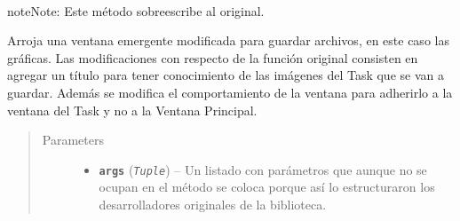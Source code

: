 \documentclass[class=report, crop=false]{standalone}
\begin{document}
\begin{fulllineitems}

\begin{fulllineitems}

~

\begin{notice}{note}{Note:}
Este método sobreescribe al original.
\end{notice}

Arroja una ventana emergente modificada para guardar archivos, 
en este caso las gráficas.\break
Las modificaciones con respecto de la función original consisten 
en agregar un título para tener conocimiento de las imágenes del 
Task que se van a guardar.\break
Además se modifica el comportamiento de la ventana para adherirlo 
a la ventana del Task y no a la Ventana Principal.

\begin{quote}\begin{description}
\item[{Parameters}] \leavevmode\begin{itemize}
\item \textbf{\texttt{args}} (\emph{\texttt{Tuple}}) -- Un listado con parámetros que aunque no se ocupan en el método se coloca porque así lo estructuraron los desarrolladores originales de la biblioteca.
\end{itemize}
\end{description}\end{quote}

\end{fulllineitems}

\end{fulllineitems}
\end{document}
